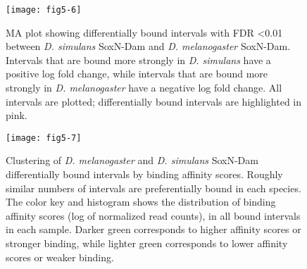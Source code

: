 \begin{figure}
\centering
\texttt{[image: fig5-6]}
\caption[Differentially bound intervals with FDR \textless 0.01 between \emph{D. simulans} SoxN-Dam and \emph{D. melanogaster} SoxN-Dam]{MA plot showing differentially bound intervals with FDR \textless 0.01 between \emph{D. simulans} SoxN-Dam and \emph{D. melanogaster} SoxN-Dam. Intervals that are bound more strongly in \emph{D. simulans} have a positive log fold change, while intervals that are bound more strongly in \emph{D. melanogaster} have a negative log fold change. All intervals are plotted; differentially bound intervals are highlighted in pink.}
\label{Figure 5.6}
\end{figure}

\begin{figure}
\centering
\texttt{[image: fig5-7]}
\caption[Clustering of \emph{D. melanogaster} and \emph{D. simulans} SoxN-Dam differentially bound intervals by binding affinity scores]{Clustering of \emph{D. melanogaster} and \emph{D. simulans} SoxN-Dam differentially bound intervals by binding affinity scores. Roughly similar numbers of intervals are preferentially bound in each species. The color key and histogram shows the distribution of binding affinity scores (log of normalized read counts), in all bound intervals in each sample. Darker green corresponds to higher affinity scores or stronger binding, while lighter green corresponds to lower affinity scores or weaker binding.}
\label{Figure 5.7}
\end{figure}

